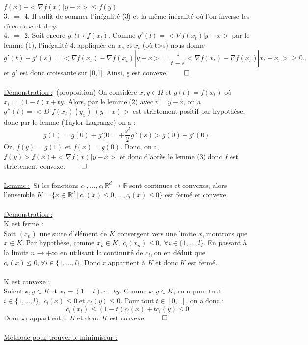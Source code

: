 \documentclass[12pt]{article}
\newcommand{\R}{\mathbb{R}}
\newcommand{\Rd}{\mathbb{R}^d}
\newcommand{\demo}{\underline{Démonstration :}}
\newcommand{\lemme}{\underline{Lemme :}}
\begin{document}
$f(x) + <\nabla f(x) | y-x> \leq f(y)$\\
3. $\Longrightarrow$ 4. Il suffit de sommer l'inégalité (3) et la même inégalité où l'on inverse les rôles de $x$ et de $y$.\\
4. $\Longrightarrow$ 2. Soit encore $g : t \mapsto f(x_t)$. Comme $g'(t) = <\nabla f(x_t)|y-x>$ par le lemme (1), l'inégalité 4. appliquée en $x_s$ et $x_t$ (où t>s) nous donne 
\[
g'(t) -g'(s) = <\nabla f(x_t) - \nabla f(x_s) | y-x> = \frac{1}{t-s}<\nabla f(x_t) - \nabla f(x_s)|x_t - x_s> \geq 0.
\]
et $g'$ est donc croissante sur [0,1]. Ainsi, g est convexe. $\qed$\\
\\
\demo $\:$ (proposition) On considère $x,y \in \Omega$ et $g(t) = f(x_t)$ où $x_t = (1-t)x + ty$. Alors, par le lemme (2) avec $v = y-x$, on a $g''(t) = <D^2f(x_t)(y_x)|(y-x)>$ est strictement positif par hypothèse, donc par le lemme (Taylor-Lagrange) on a :
\[ g(1) = g(0) + g'(0= + \frac{s^2}{2}g''(s) > g(0) + g'(0).\]
Or, $f(y) = g(1)$ et $f(x) = g(0)$. Donc, on a, $f(y) > f(x) + <\nabla f(x)|y-x>$ et donc d'après le lemme (3) donc $f$ est strictement convexe. $\qed$\\
\\
\lemme $\:$ Si les fonctions $c_1, \dots, c_l \: \Rd \to \R$ sont continues et convexes, alors l'ensemble $K = \{x \in \Rd \:|\: c_1(x) \leq 0, \dots, c_l(x) \leq 0 \}$ est fermé et convexe.\\
\\
\demo  $\:$\\
K est fermé :\\
Soit $(x_n)$ une suite d'élément de $K$ convergent vers une limite $x$, montrons que $x \in K$. Par hypothèse, comme $x_n \in K, \: c_i(x_n) \leq 0, \: \forall i \in \{1, \dots, l \}$. En passant à la limite $ n \to +\infty$ en utilisant la continuité de $c_i$, on en déduit que $c_i(x) \leq 0, \forall i \in \{1, \dots, l \}$. Donc $x$ appartient à $K$ et donc $K$ est fermé.\\
\\
K est convexe :\\
Soient $x,y \in K$ et $x_t = (1-t)x + ty$. Comme $x,y \in K$, on a pour tout $i \in \{1, \dots, l \}, \: c_i(x) \leq 0 \text{ et } c_i(y) \leq 0$. Pour tout $t\in [0,1]$, on a donc :
\[
c_i(x_t) \leq (1-t)c_i(x) + tc_i(y) \leq 0
\]
Donc $x_t$ appartient à $K$ et donc $K$ est convexe. $\qed$\\
\\
\underline{Méthode pour trouver le minimiseur :}\\
\end{document}
